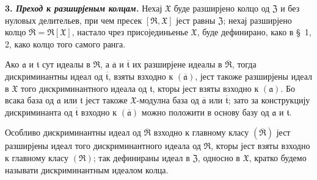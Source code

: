 \documentclass[11pt]{article}
\begin{document}
\setcounter{footnote}{26}

\textbf{3. \emph{Преход к разширјеным колцам.}} Нехај $\mathfrak X$ буде разширјено колцо од $\mathfrak Z$ и без нуловых делительев, при чем пресек $[\mathfrak R,\mathfrak X]$ јест равны $\mathfrak Z$; нехај разширјено колцо $\overline{\mathfrak R}=\mathfrak R[\mathfrak X]$, настало чрез присојединьенье $\mathfrak X$, буде дефинирано, како в \S~1, 2, како колцо того самого ранга.

Ако $\mathfrak a$ и $\mathfrak t$ сут идеалы в $\mathfrak R$, а $\overline{\mathfrak a}$ и $\overline{\mathfrak t}$ их разширјене идеалы в $\overline{\mathfrak R}$, тогда дискриминантны идеал од $\overline{\mathfrak t}$, взяты взходно к $(\overline{\mathfrak a})$, јест такоже разширјены идеал в $\mathfrak X$ того дискриминантного идеала од $\mathfrak t$, кторы јест взяты взходно к $(\mathfrak a)$. Бо всака база од $\mathfrak a$ или $\mathfrak t$ јест такоже $\mathfrak X$-модулна база од $\overline{\mathfrak a}$ или $\overline{\mathfrak t}$; зато за конструкцију дискриминанта од $\overline{\mathfrak t}$ взходно к $(\overline{\mathfrak a})$ можно положити в основу базу од $\mathfrak a$ и $\mathfrak t$.

Особливо дискриминантны идеал од $\overline{\mathfrak R}$ взходно к главному класу $(\overline{\mathfrak R})$ јест разширјены идеал того дискриминантного идеала од $\mathfrak R$, кторы јест взяты взходно к главному класу $(\mathfrak R)$; так дефинираны идеал в $\mathfrak Z$, односно в $\mathfrak X$, кратко будемо называти дискриминантным идеалом колца.
\end{document}
